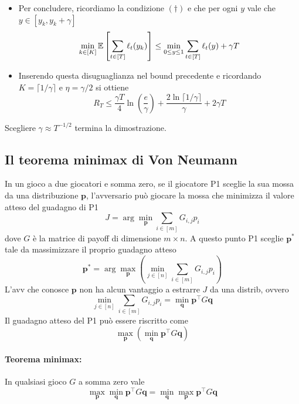 \begin{itemize}
    \item Per concludere, ricordiamo la condizione $(\dag)$ e che per ogni $y$ vale che $y \in [y_k, y_k + \gamma]$
    $$ \min_{k \in [K]} \mathbb{E} \left[\sum_{t \in [T]} \ell_t (y_k)\right] \leq \min_{0 \leq y \leq 1} \sum_{t \in [T]} \ell_t (y) + \gamma T $$

    \item Inserendo questa disuguaglianza nel bound precedente e ricordando $K = \lceil 1/\gamma \rceil$ e $\eta = \gamma/2$ si ottiene
    $$ R_T \leq \frac{\gamma T}{4} \ln \left(\frac{e}{\gamma}\right) + \frac{2 \ln \lceil 1/\gamma \rceil }{\gamma} + 2 \gamma T $$
\end{itemize}
Scegliere $\gamma \approx T^{-1/2}$ termina la dimostrazione.

\subsection{Il teorema minimax di Von Neumann}

In un gioco a due giocatori e somma zero, se il giocatore P1 sceglie la sua mossa da una distribuzione $\bm p$, l'avversario può giocare la mossa che minimizza il valore atteso del guadagno di P1
$$ J = \arg \min_{\bm p} \sum_{i \in [m]} G_{i,j} p_i $$
dove $G$ è la matrice di payoff di dimensione $m \times n$. A questo punto P1 sceglie $\bm p^\ast$ tale da massimizzare il proprio guadagno atteso
$$ \bm p^\ast = \arg \max_{\bm p} \left(\min_{j \in [n]} \sum_{i \in [m]} G_{i,j} p_i \right) $$
L'avv che conosce $\bm p$ non ha alcun vantaggio a estrarre $J$ da una distrib, ovvero
$$ \min_{j \in [n]} \sum_{i \in [m]} G_{i,j} p_i = \min_{\bm q} \bm p^\top G \bm q $$
Il guadagno atteso del P1 può essere riscritto come
$$ \max_{\bm p} \left(\min_{\bm q} \bm p^\top G \bm q \right) $$

\paragraph{Teorema minimax:} In qualsiasi gioco $G$ a somma zero vale
$$ \max_{\bm p} \min_{\bm q} \bm p^\top G \bm q = \min_{\bm q} \max_{\bm p} \bm p^\top G \bm q $$

